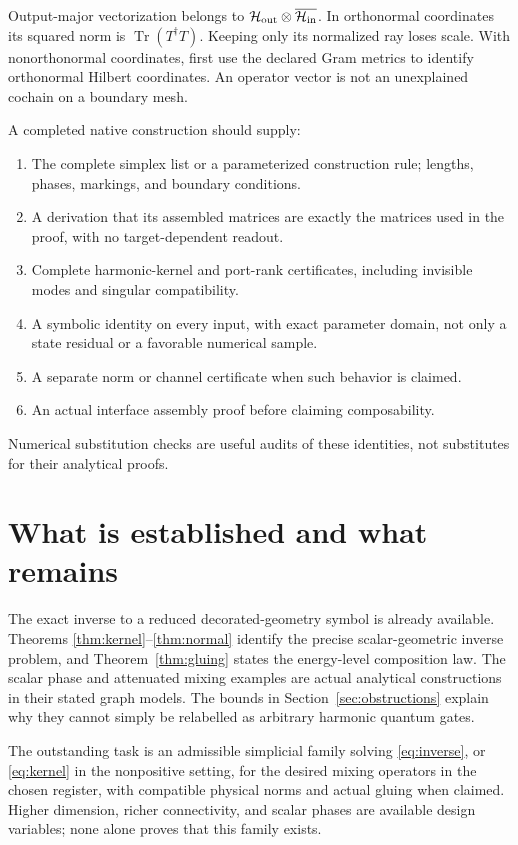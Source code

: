 \documentclass[11pt]{article}
\theoremstyle{definition}
\newcommand{\HH}{\mathcal H}
\newcommand{\Tr}{\operatorname{Tr}}
\begin{document}
Output-major vectorization belongs to
$\HH_{\rm out}\otimes\overline{\HH_{\rm in}}$.
In orthonormal coordinates its squared norm is $\Tr(T^\dagger T)$.
Keeping only its normalized ray loses scale. With nonorthonormal
coordinates, first use the declared Gram metrics to identify
orthonormal Hilbert coordinates. An operator vector is not an
unexplained cochain on a boundary mesh.

A completed native construction should supply:
\begin{enumerate}[nosep]
\item The complete simplex list or a parameterized construction rule;
lengths, phases, markings, and boundary conditions.
\item A derivation that its assembled matrices are exactly the matrices
used in the proof, with no target-dependent readout.
\item Complete harmonic-kernel and port-rank certificates, including
invisible modes and singular compatibility.
\item A symbolic identity on every input, with exact parameter domain,
not only a state residual or a favorable numerical sample.
\item A separate norm or channel certificate when such behavior is claimed.
\item An actual interface assembly proof before claiming composability.
\end{enumerate}
Numerical substitution checks are useful audits of these identities,
not substitutes for their analytical proofs.

\section{What is established and what remains}\label{sec:verdict}
The exact inverse to a reduced decorated-geometry symbol is already
available. Theorems \ref{thm:kernel}--\ref{thm:normal} identify the precise
scalar-geometric inverse problem, and Theorem~\ref{thm:gluing} states
the energy-level composition law. The scalar phase and attenuated mixing
examples are actual analytical constructions in their stated graph
models. The bounds in Section~\ref{sec:obstructions} explain why they
cannot simply be relabelled as arbitrary harmonic quantum gates.

The outstanding task is an admissible simplicial family solving
\eqref{eq:inverse}, or \eqref{eq:kernel} in the nonpositive setting,
for the desired mixing operators in the chosen register, with
compatible physical norms and actual gluing when claimed.
Higher dimension, richer connectivity, and scalar phases are available
design variables; none alone proves that this family exists.
\end{document}
